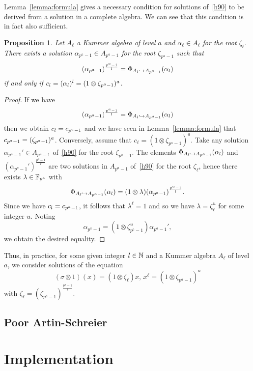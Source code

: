 \documentclass{sig-alternate}
\newtheorem{proposition}{Proposition}
\begin{document}
Lemma~\ref{lemma:formula} gives a necessary condition for solutions of~\eqref{h90}
to be derived from a solution in a complete algebra. We can see that this condition is in fact
also sufficient.
\begin{proposition}
  Let $A_\ell$ a Kummer algebra of level $a$ and $\alpha_\ell\in A_\ell$ for the
  root $\zeta_\ell$. There exists a solution $\alpha_{p^a-1}\in A_{p^a-1}$ for
  the root $\zeta_{p^a-1}$ such that
  \[
    (\alpha_{p^a-1})^{\frac{p^a-1}{l}}=\Phi_{A_{l}\hookrightarrow A_{p^a-1}}(\alpha_l)
  \]
  if and only if $c_l = (\alpha_{l})^{l} = (1\otimes\zeta_{p^a-1})^a$.
\end{proposition}
\begin{proof}
 If we have  
  \[
    (\alpha_{p^a-1})^{\frac{p^a-1}{l}}=\Phi_{A_{l}\hookrightarrow A_{p^a-1}}(\alpha_l)
  \]
  then we obtain $c_{l} = c_{p^a-1}$ and we have seen in
  Lemma~\ref{lemma:formula} that $c_{p^a-1}=(\zeta_{p^a-1})^a$. Conversely,
  assume that $c_\ell = (1\otimes\zeta_{p^a-1})^a$. Take any solution
  $\alpha_{p^a-1}'\in A_{p^a-1}$ of~\eqref{h90} for the root $\zeta_{p^a-1}$.
  The elements $\Phi_{A_{l}\hookrightarrow A_{p^a-1}}(\alpha_l)$ and
  $(\alpha_{p^a-1}')^{\frac{p^a-1}{\ell}}$ are two solutions in $A_{p^a-1}$
  of~\eqref{h90} for the root $\zeta_{\ell}$, hence there exists
  $\lambda\in\mathbb{F}_{p^a}$ with
  \[
    \Phi_{A_{l}\hookrightarrow A_{p^a-1}}(\alpha_l) =
    (1\otimes\lambda)(\alpha_{p^a-1})^{\frac{p^a-1}{l}}.
  \]
  Since we have $c_l = c_{p^a-1}$, it follows that $\lambda^\ell = 1$ and
  so we have $\lambda=\zeta_{\ell}^u$ for some integer $u$. Noting
  \[
    \alpha_{p^a-1} = (1\otimes\zeta_{p^a-1}^u)\alpha_{p^a-1}',
  \]
  we obtain the desired equality.
\end{proof}

Thus, in practice, for some given integer
$l\in\mathbb{N}$ and a Kummer algebra $A_\ell$ of level $a$, we consider solutions of the
equation
\begin{equation}
  \tag{H90$^\star$}
  (\sigma\otimes1)(x) = (1\otimes\zeta_\ell)x,\,x^\ell =
  (1\otimes\zeta_{p^a-1})^a
  \label{h90s}
\end{equation}
with $\zeta_\ell=(\zeta_{p^a-1})^{\frac{p^a-1}{\ell}}$.

\subsection{Poor Artin-Schreier}




\section{Implementation}
\label{sec:implementation}



\end{document}
